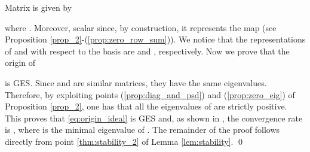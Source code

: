 \documentclass[a4paper]{article}
\theoremstyle{plain}
\begin{document}
Matrix  is given by 

where . Moreover, scalar  since, by construction, it represents the map  (see Proposition \ref{prop_2}-(\ref{prop:zero_row_sum})). We notice that the representations of  and  with respect to the basis  are   and , respectively.
Now we prove that the origin of

is GES. Since  and  are similar matrices, they have the same
eigenvalues. Therefore, by exploiting points (\ref{prop:diag_and_psd}) and (\ref{prop:zero_eig}) of Proposition
\ref{prop_2}, one has that all the eigenvalues of 
are strictly positive. This proves that \eqref{eq:origin_ideal} is GES
and, as shown in \cite{callier2012linear}, the convergence rate is , where  is the minimal eigenvalue of .
The remainder of the proof follows directly from point \ref{thm:stability_2} of Lemma \ref{lem:stability}. \qed     \newpage
\end{document}
